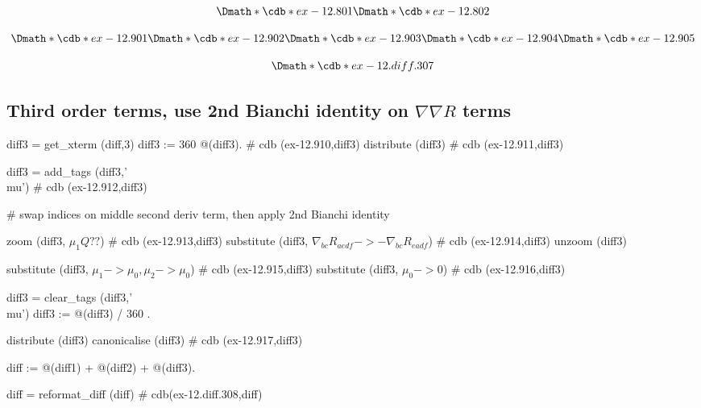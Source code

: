 \documentclass[12pt]{cdblatex}
\begin{document}
\clearpage

\begin{dgroup*}
   \Dmath*{\cdb*{ex-12.801}}
   \Dmath*{\cdb*{ex-12.802}}
\end{dgroup*}

\begin{dgroup*}
   \Dmath*{\cdb*{ex-12.901}}
   \Dmath*{\cdb*{ex-12.902}}
   \Dmath*{\cdb*{ex-12.903}}
   \Dmath*{\cdb*{ex-12.904}}
   \Dmath*{\cdb*{ex-12.905}}
\end{dgroup*}

\begin{dgroup*}
   \Dmath*{\cdb*{ex-12.diff.307}}
\end{dgroup*}

\clearpage

\subsection*{Third order terms, use 2nd Bianchi identity on $\nabla\nabla R$ terms}

\begin{cadabra}
   diff3  = get_xterm (diff,3)
   diff3 := 360 @(diff3).                                                           # cdb (ex-12.910,diff3)
   distribute (diff3)                                                               # cdb (ex-12.911,diff3)

   diff3 = add_tags (diff3,'\\mu')                                                  # cdb (ex-12.912,diff3)

   # swap indices on middle second deriv term, then apply 2nd Bianchi identity

   zoom       (diff3, $\mu_{1} Q??$)                                                # cdb (ex-12.913,diff3)
   substitute (diff3, $\nabla_{b c}{R_{a e d f}} -> - \nabla_{b c}{R_{e a d f}}$)   # cdb (ex-12.914,diff3)
   unzoom     (diff3)

   substitute (diff3, $\mu_{1} -> \mu_{0}, \mu_{2} -> \mu_{0}$)                     # cdb (ex-12.915,diff3)
   substitute (diff3, $\mu_{0} -> 0$)                                               # cdb (ex-12.916,diff3)

   diff3 = clear_tags (diff3,'\\mu')
   diff3 := @(diff3) / 360 .

   distribute   (diff3)
   canonicalise (diff3)                                                             # cdb (ex-12.917,diff3)

   diff := @(diff1) + @(diff2) + @(diff3).

   diff  = reformat_diff (diff)                                                     # cdb(ex-12.diff.308,diff)
\end{cadabra}
\end{document}
